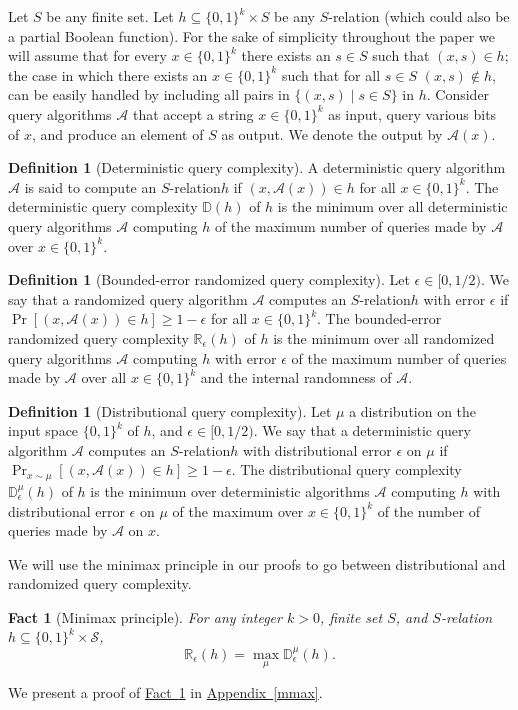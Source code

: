 \documentclass[11pt]{article}
\numberwithin{equation}{section}
\newtheorem{fact}[theorem]{Fact}
\theoremstyle{definition}
\newtheorem{definition}[theorem]{Definition}
\theoremstyle{plain}
\newcommand{\R}{\mathbb R}
\newcommand{\expref}[2]{\hyperref[#2]{#1~\ref{#2}}}
\newcommand{\relation}{$S$-relation\xspace}     %
\newcommand{\arelation}{an $S$-relation\xspace} %
\newcommand{\D}{\mathbb{D}}
\newcommand{\cA}{\mathcal{A}}
\begin{document}
Let $S$ be any
%
finite set. Let $h \subseteq \{0,1\}^k \times S$ be any \relation 
%
(which could also be a partial Boolean function). For the sake of simplicity throughout the paper we will assume that for every $x \in \{0,1\}^k$ there exists an $s \in S$ such that $(x,s) \in h$; the case in which there exists an $x \in \{0,1\}^k$ such that for all $s \in S$ $(x,s) \notin h$, can be easily handled by including all pairs in $\{(x, s) \mid s \in S\}$ in $h$. Consider query algorithms $\mathcal A$ that accept a string $x \in\{0,1\}^k$ as input, query various bits of $x$, and produce an element of $S$ as output. We denote the output by $\mathcal{A}(x)$.
\begin{definition}[Deterministic query complexity]
A deterministic query algorithm $\cA$ is said to compute
%
\arelation $h$ if $(x, \cA(x)) \in h$ for all $x \in \{0,1\}^k$.
The deterministic query complexity $\D(h)$ of $h$ is the minimum over all deterministic query algorithms $\cA$ computing $h$ of the maximum number of queries made by $\cA$ over $x \in \{0,1\}^k$.  
\end{definition}

\begin{definition}[Bounded-error randomized query complexity]
Let $\epsilon \in [0,1/2)$.  We say that a randomized query algorithm $\cA$ computes
%
\arelation $h$ with error $\epsilon$ if $\Pr[(x,\cA(x)) \in h] \geq 1 - \epsilon$ for all $x \in \{0,1\}^k$.
The bounded-error randomized query complexity $\R_\epsilon(h)$ of $h$ is the minimum over all randomized query algorithms $\cA$ computing $h$ with error $\epsilon$ of the 
maximum number of queries made by $\cA$ over all $x \in \{0,1\}^k$ and the internal randomness of $\cA$.
\end{definition}

\begin{definition}[Distributional query complexity]
 Let $\mu$ a distribution on the input space $\{0,1\}^k$ of $h$, and $\epsilon \in [0,1/2)$.  We say that a deterministic query algorithm $\cA$ computes
\arelation $h$ with distributional error $\epsilon$ on $\mu$ if 
 $\Pr_{x \sim \mu}[(x,\mathcal A(x)) \in h] \geq 1 - \epsilon$.
 The distributional query complexity $\D^\mu_\epsilon(h)$ of $h$ is the minimum over deterministic algorithms $\cA$ computing $h$ with distributional error $\epsilon$ on $\mu$ of the maximum over $x \in \{0,1\}^k$ 
 of the number of queries made by $\cA$ on $x$.
 \end{definition}

We will use the minimax principle in our proofs to go between distributional and randomized query complexity.
\begin{fact}[Minimax principle]
\label{minmax}
For any integer $k >0$, %
finite set $S$, and \relation $h \subseteq \{0,1\}^k \times \mathcal{S}$,
\[\R_\epsilon(h)=\max_{\mu}\D_\epsilon^\mu(h).\]
\end{fact}
We present a proof of \expref{Fact}{minmax} in \expref{Appendix}{mmax}.
\end{document}
